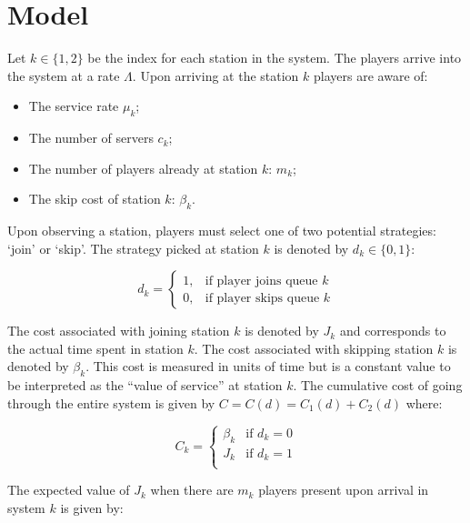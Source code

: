 \documentclass[12pt]{article}
\begin{document}
\section{Model}\label{model}

Let $k\in\{1,2\}$ be the index for each station in the system.
The players arrive into the system at a rate $\Lambda$.
Upon arriving at the station $k$ players are aware of:

\begin{itemize}
    \item The service rate $\mu_k$;
    \item The number of servers $c_k$;
    \item The number of players already at station $k$: $m_k$;
    \item The skip cost of station $k$: $\beta_k$.
\end{itemize}

Upon observing a station, players must select one of two potential strategies: `join' or `skip'.
The strategy picked at station $k$ is denoted by $d_k\in\{0,1\}$:

\begin{equation}\label{eq:decision}
    d_k=
\begin{cases}
    1,& \text{if player joins queue } k \\
    0,& \text{if player skips queue } k
\end{cases}
\end{equation}

The cost associated with joining station $k$ is denoted by $J_k$ and corresponds to the actual time spent in station $k$.
The cost associated with skipping station $k$ is denoted by $\beta_k$.
This cost is measured in units of time but is a constant value to be interpreted as the ``value of service'' at station $k$.
The cumulative cost of going through the entire system is given by $C=C(d)=C_1(d)+C_2(d)$ where:

\begin{equation}\label{eq:actualcost}
C_{k} = \begin{cases}
        \beta_k&\text{if }d_k=0\\
        J_k&\text{if }d_k=1\\
        \end{cases}
\end{equation}

The expected value of $J_k$ when there are $m_k$ players present upon arrival in system $k$ is given by:
\end{document}
